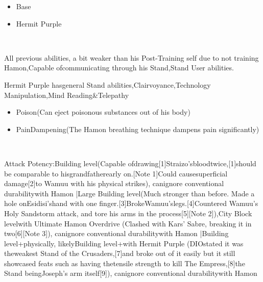 \documentclass[a4paper,12pt]{article}
\begin{document}
\begin{itemize}
\item Base
\item Hermit Purple
\end{itemize}\\ \par \vspace{0.5cm}

All previous abilities, a bit weaker than his Post-Training self due to not training Hamon,Capable ofcommunicating through his Stand,Stand User abilities.\\ \par \vspace{0.5cm}

Hermit Purple hasgeneral Stand abilities,Clairvoyance,Technology Manipulation,Mind Reading&Telepathy\\ \par \vspace{0.5cm}

\begin{itemize}
\item Poison(Can eject poisonous substances out of his body)
\item PainDampening(The Hamon breathing technique dampens pain significantly)
\end{itemize}\\ \par \vspace{0.5cm}

Attack Potency:Building level(Capable ofdrawing[1]Straizo'sbloodtwice,[1]should be comparable to hisgrandfatherearly on.[Note 1]Could causesuperficial damage[2]to Wamuu with his physical strikes), canignore conventional durabilitywith Hamon |Large Building level(Much stronger than before. Made a hole onEsidisi'shand with one finger.[3]BrokeWamuu'slegs.[4]Countered Wamuu's Holy Sandstorm attack, and tore his arms in the process[5][Note 2]),City Block levelwith Ultimate Hamon Overdrive (Clashed with Kars' Sabre, breaking it in two[6][Note 3]), canignore conventional durabilitywith Hamon |Building level+physically, likelyBuilding level+with Hermit Purple (DIOstated it was theweakest Stand of the Crusaders,[7]and broke out of it easily but it still showcased feats such as having thetensile strength to kill The Empress,[8]the Stand beingJoseph's arm itself[9]), canignore conventional durabilitywith Hamon\\ \par \vspace{0.5cm}
\end{document}
